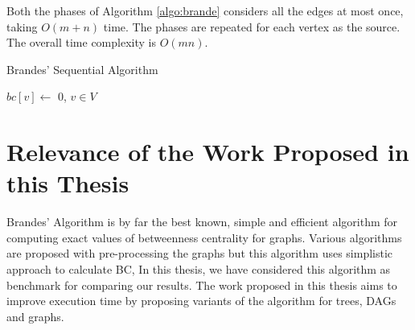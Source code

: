 Both the phases of Algorithm \ref{algo:brande} considers all the edges at most once, taking $O(m + n)$ time. The phases are repeated for each vertex as the source. The overall time complexity is $O(mn)$.

\begin{algorithm}
\caption{Brandes' Sequential Algorithm}
\label{algo:brande}

$bc[v] \leftarrow$ 0, $v \in V$\;
\end{algorithm}
\vspace{-1.0em}
\section{Relevance of the Work Proposed in this Thesis}
Brandes' Algorithm is by far the best known, simple and efficient algorithm for computing exact values of betweenness centrality for graphs. Various algorithms are proposed with pre-processing the graphs but this algorithm uses simplistic approach to calculate BC, In this thesis, we have considered this algorithm as benchmark for comparing our results. 
The work proposed in this thesis aims to improve execution time by proposing variants of the algorithm for trees, DAGs and graphs.


